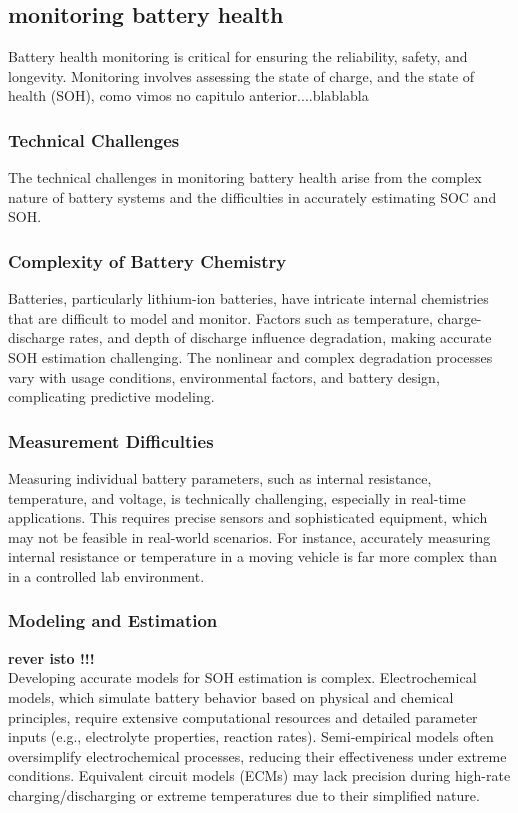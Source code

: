 
\subsection{monitoring battery health}
Battery health monitoring is critical for ensuring the reliability, safety, and longevity. Monitoring involves assessing the state of charge,
and the state of health (SOH),
como vimos no capitulo anterior....blablabla
\subsubsection{Technical Challenges}
The technical challenges in monitoring battery health arise from the complex nature of battery systems and the difficulties in accurately estimating SOC and SOH.

\subsubsection{Complexity of Battery Chemistry}
Batteries, particularly lithium-ion batteries, have intricate internal chemistries that are difficult to model and monitor.
Factors such as temperature, charge-discharge rates, and depth of discharge influence degradation, making accurate SOH estimation challenging. 
The nonlinear and complex degradation processes vary with usage conditions, environmental factors, and battery design, complicating predictive modeling.

\subsubsection{Measurement Difficulties}
Measuring individual battery parameters, such as internal resistance, temperature, and voltage, is technically challenging, especially in real-time applications. 
This requires precise sensors and sophisticated equipment, which may not be feasible in real-world scenarios. 
For instance, accurately measuring internal resistance or temperature in a moving vehicle is far more complex than in a controlled lab environment.

\subsubsection{Modeling and Estimation}
\textbf{rever isto !!!} \\
Developing accurate models for SOH estimation is complex. 
Electrochemical models, which simulate battery behavior based on physical and chemical principles, require extensive computational resources and detailed parameter inputs (e.g., electrolyte properties, reaction rates). 
Semi-empirical models often oversimplify electrochemical processes, reducing their effectiveness under extreme conditions. Equivalent circuit models (ECMs) may lack precision during high-rate charging/discharging or extreme temperatures due to their simplified nature.

